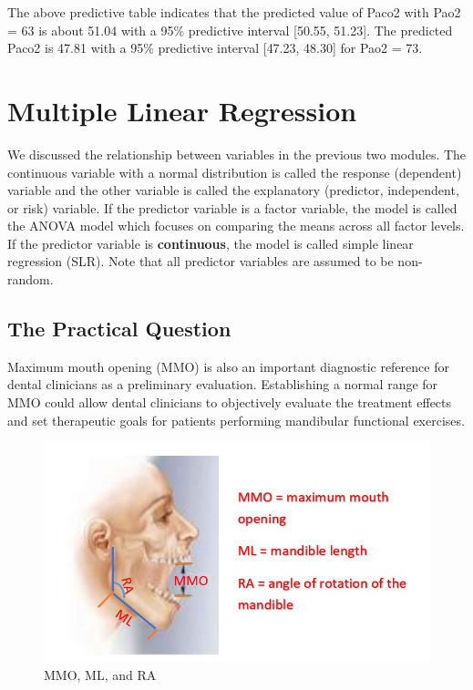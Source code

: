 \documentclass[
]{book}
\begin{document}
The above predictive table indicates that the predicted value of Paco2 with Pao2 = 63 is about 51.04 with a 95\% predictive interval {[}50.55, 51.23{]}. The predicted Paco2 is 47.81 with a 95\% predictive interval {[}47.23, 48.30{]} for Pao2 = 73.

\hypertarget{multiple-linear-regression}{%
\chapter{Multiple Linear Regression}\label{multiple-linear-regression}}

We discussed the relationship between variables in the previous two modules. The continuous variable with a normal distribution is called the response (dependent) variable and the other variable is called the explanatory (predictor, independent, or risk) variable. If the predictor variable is a factor variable, the model is called the ANOVA model which focuses on comparing the means across all factor levels. If the predictor variable is \textbf{continuous}, the model is called simple linear regression (SLR). Note that all predictor variables are assumed to be non-random.

\hypertarget{the-practical-question}{%
\section{The Practical Question}\label{the-practical-question}}

Maximum mouth opening (MMO) is also an important diagnostic reference for dental clinicians as a preliminary evaluation. Establishing a normal range for MMO could allow dental clinicians to objectively evaluate the treatment effects and set therapeutic goals for patients performing mandibular functional exercises.

\begin{figure}

{\centering \includegraphics[width=0.8\linewidth]{img10/w10-MMO} 

}

\caption{MMO, ML, and RA}\label{fig:unnamed-chunk-151}
\end{figure}
\end{document}
